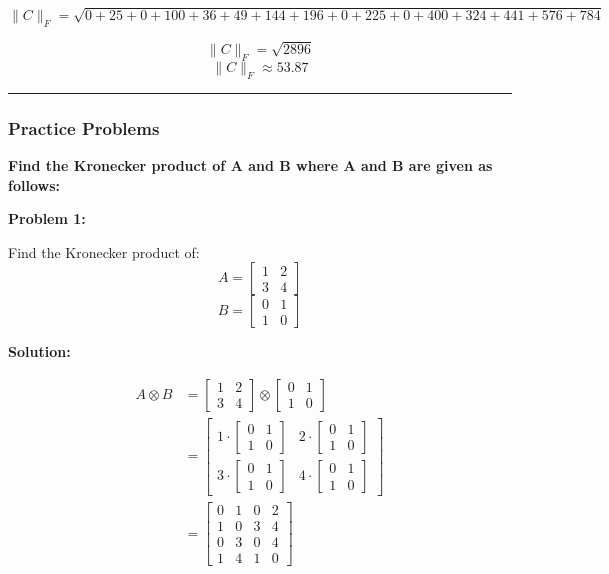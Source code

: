 \documentclass[
  letterpaper,
  DIV=11,
  numbers=noendperiod]{scrreprt}
\theoremstyle{plain}
\theoremstyle{definition}
\theoremstyle{remark}
\begin{document}
\[\|C\|_F = \sqrt{0 + 25 + 0 + 100 + 36 + 49 + 144 + 196 + 0 + 225 + 0 + 400 + 324 + 441 + 576 + 784}\]

\[\|C\|_F = \sqrt{2896}\] \[\|C\|_F \approx 53.87\]

\begin{center}\rule{0.5\linewidth}{0.5pt}\end{center}

\subsubsection{Practice Problems}\label{practice-problems-4}

\textbf{Find the Kronecker product of A and B where A and B are given as
follows:}

\textbf{Problem 1:}

Find the Kronecker product of:
\[A=\begin{bmatrix}1&2\\3&4\end{bmatrix}\]
\[B=\begin{bmatrix}0&1\\1&0\end{bmatrix}\]

\textbf{Solution:}

\begin{align*}
A \otimes B &= \begin{bmatrix}1&2\\3&4\end{bmatrix} \otimes \begin{bmatrix}0&1\\1&0\end{bmatrix} \\
&= \begin{bmatrix}
1 \cdot \begin{bmatrix}0&1\\1&0\end{bmatrix} & 2 \cdot \begin{bmatrix}0&1\\1&0\end{bmatrix} \\
3 \cdot \begin{bmatrix}0&1\\1&0\end{bmatrix} & 4 \cdot \begin{bmatrix}0&1\\1&0\end{bmatrix}
\end{bmatrix} \\
&= \begin{bmatrix}
0 & 1 & 0 & 2 \\
1 & 0 & 3 & 4 \\
0 & 3 & 0 & 4 \\
1 & 4 & 1 & 0
\end{bmatrix}
\end{align*}
\end{document}
